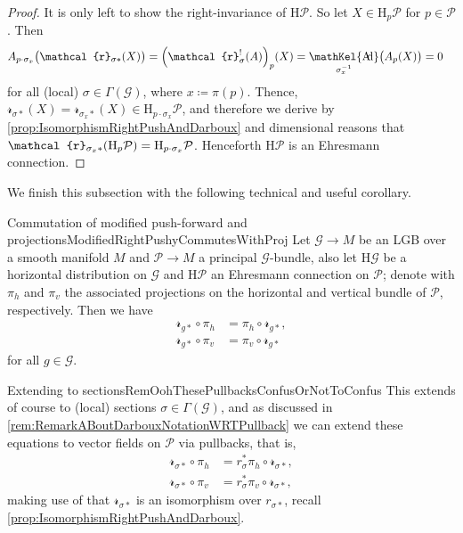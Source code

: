 \documentclass[reqno,a4paper,oneside]{amsart}
\theoremstyle{plain}
\theoremstyle{remark}
\theoremstyle{definition}
\DeclareMathOperator{\sAd}{\mathKel{A\mkern-5.5mu d}}
\begin{document}
\begin{proof}
It is only left to show the right-invariance of $\mathrm{H}\mathcal{P}$. So let $X \in \mathrm{H}_p\mathcal{P}$ for $p \in \mathcal{P}$. Then
\begin{align*}
A_{p \cdot \sigma_x}\bigl( \mathcal{r}_{\sigma*}(X) \bigr)
&=
\mleft(\mathcal{r}^!_\sigma(A)\mright)_p(X)
=
\sAd_{\sigma_x^{-1}}\bigl( A_p(X) \bigr)
=
0
\end{align*}
for all (local) $\sigma \in \Gamma(\mathcal{G})$, where $x \coloneqq \pi(p)$. Thence, $\mathcal{r}_{\sigma*}(X) = \mathcal{r}_{\sigma_x*}(X) \in \mathrm{H}_{p \cdot \sigma_x}\mathcal{P}$, and therefore we derive by \ref{prop:IsomorphismRightPushAndDarboux} and dimensional reasons that $\mathcal{r}_{\sigma_x*}\mleft(\mathrm{H}_p \mathcal{P}\mright) = \mathrm{H}_{p \cdot \sigma_x}\mathcal{P}$. Henceforth $\mathrm{H}\mathcal{P}$ is an Ehresmann connection.
\end{proof}

We finish this subsection with the following technical and useful corollary.

\begin{corollaries}{Commutation of modified push-forward and projections}{ModifiedRightPushyCommutesWithProj}
Let $\mathcal{G} \to M$ be an LGB over a smooth manifold $M$ and $\mathcal{P} \to M$ a principal $\mathcal{G}$-bundle, also let $\mathrm{H}\mathcal{G}$ be a horizontal distribution on $\mathcal{G}$ and $\mathrm{H}\mathcal{P}$ an Ehresmann connection on $\mathcal{P}$; denote with $\pi_h$ and $\pi_v$ the associated projections on the horizontal and vertical bundle of $\mathcal{P}$, respectively. Then we have
\begin{align*}
\mathcal{r}_{g*} \circ \pi_h
&=
\pi_h \circ \mathcal{r}_{g*},\\
\mathcal{r}_{g*} \circ \pi_v
&=
\pi_v \circ \mathcal{r}_{g*}
\end{align*}
for all $g \in \mathcal{G}$.
\end{corollaries}

\begin{remarks}{Extending to sections}{RemOohThesePullbacksConfusOrNotToConfus}
This extends of course to (local) sections $\sigma \in \Gamma(\mathcal{G})$, and as discussed in \ref{rem:RemarkABoutDarbouxNotationWRTPullback} we can extend these equations to vector fields on $\mathcal{P}$ via pullbacks, that is,
\begin{align*}
\mathcal{r}_{\sigma*} \circ \pi_h
&=
r_\sigma^*\pi_h \circ \mathcal{r}_{\sigma*},\\
\mathcal{r}_{\sigma*} \circ \pi_v
&=
r_\sigma^*\pi_v \circ \mathcal{r}_{\sigma*},
\end{align*}
making use of that $\mathcal{r}_{\sigma*}$ is an isomorphism over $r_{\sigma*}$, recall \ref{prop:IsomorphismRightPushAndDarboux}.
\end{remarks}
\end{document}
